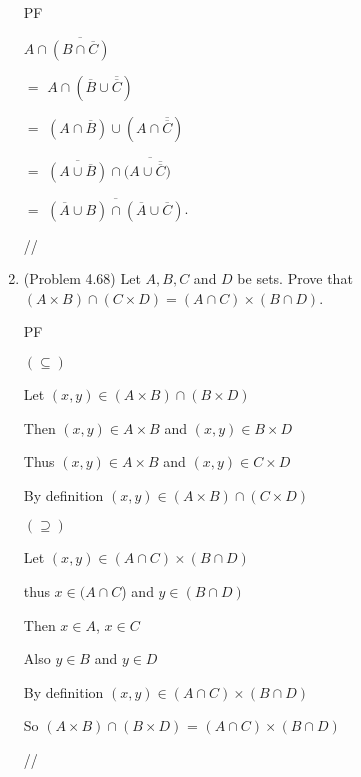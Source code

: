\documentclass[12pt]{article}
\begin{document}
\begin{enumerate}
{PF

$A \cap \overline{(B \cap \overline{C})}$ 

$=$  $A \cap {(\overline B \cup  \overline { \overline C})}$

 $=$ $(A \cap \overline B) \cup (A \cap \overline {\overline C})$

$=$ $\overline {(A \cup \overline B)} \cap (\overline{A \cup \overline {\overline C})}$

$=$ $ \overline{(\overline{A} \cup B) \cap (\overline{A} \cup \overline{C})}$.

//
}

\item (Problem 4.68) Let $A, B, C$ and $D$ be sets.  Prove that \newline $(A \times B) \cap (C \times D) = (A \cap C) \times (B \cap D)$.

{PF

	$(\subseteq)$

	Let $(x,y) \in (A \times B) \cap (B \times D)$
	
	Then $(x,y) \in A \times B $ and $ (x,y) \in B \times D$
	
	Thus $(x,y) \in A \times B$ and $(x,y) \in  C \times D$
	
	By definition $(x,y) \in (A \times B) \cap (C \times D)$
	
	
	$(\supseteq)$
	
	Let $(x,y) \in ( A \cap C) \times (B \cap D)$
	
	thus $x \in (A \cap C$) and $y \in (B \cap D)$
	
	Then  $x \in A$, $x \in C$ 
	
	Also  $y \in B$ and $y \in D$
	
	By definition $(x,y) \in ( A \cap C) \times (B \cap D)$
	
	So $(A \times B) \cap (B \times D)$ = $( A \cap C) \times (B \cap D)$
	
	//


}



\end{enumerate}
\end{document}
